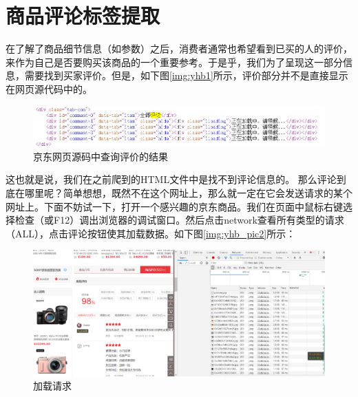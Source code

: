 \section{商品评论标签提取}
在了解了商品细节信息（如参数）之后，消费者通常也希望看到已买的人的评价，来作为自己是否要购买该商品的一个重要参考。于是乎，我们为了呈现这一部分信息，需要找到买家评价。但是，如下图\ref{img:yhb1}所示，评价部分并不是直接显示在网页源代码中的。

\begin{figure}[htbp]
\centering
\includegraphics[width=13.5cm]{img/yhb/web_source_code_jd.png}
\caption{京东网页源码中查询评价的结果} %
\label{img:yhb_pict1}   %
\end{figure}

这也就是说，我们在之前爬到的HTML文件中是找不到评论信息的。
那么评论到底在哪里呢？简单想想，既然不在这个网址上，那么就一定在它会发送请求的某个网址上。下面不妨试一下，打开一个感兴趣的京东商品。我们在页面中鼠标右键选择检查（或F12）调出浏览器的调试窗口。然后点击network查看所有类型的请求（ALL），点击评论按钮使其加载数据。如下图\ref{img:yhb_pic2}所示：

\begin{figure}[htbp]
\centering
\includegraphics[width=13.5cm]{img/yhb/network_jd.png}
\caption{加载请求} %
\label{img:yhb_pict2}   %
\end{figure}


